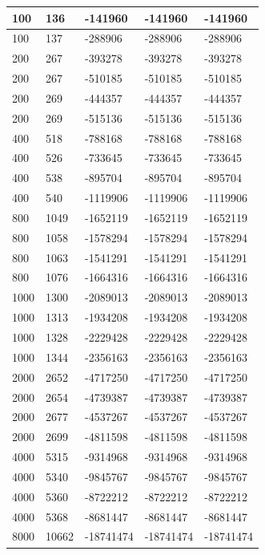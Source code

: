 \begin{longtable}[H]{|p{1.5cm}|p{1.5cm}|p{2cm}|p{3cm}|p{4cm}|}
    100 & 136 & -141960 & -141960 & -141960 \\ \hline
    100 & 137 & -288906 & -288906 & -288906 \\ \hline
    200 & 267 & -393278 & -393278 & -393278 \\ \hline
    200 & 267 & -510185 & -510185 & -510185 \\ \hline
    200 & 269 & -444357 & -444357 & -444357 \\ \hline
    200 & 269 & -515136 & -515136 & -515136 \\ \hline
    400 & 518 & -788168 & -788168 & -788168 \\ \hline
    400 & 526 & -733645 & -733645 & -733645 \\ \hline
    400 & 538 & -895704 & -895704 & -895704 \\ \hline
    400 & 540 & -1119906 & -1119906 & -1119906 \\ \hline
    800 & 1049 & -1652119 & -1652119 & -1652119 \\ \hline 
    800 & 1058 & -1578294 & -1578294 & -1578294 \\ \hline 
    800 & 1063 & -1541291 & -1541291 & -1541291 \\ \hline
    800 & 1076 & -1664316 & -1664316 & -1664316 \\ \hline
    1000 & 1300 & -2089013 & -2089013 & -2089013 \\ \hline
    1000 & 1313 & -1934208 & -1934208 & -1934208 \\ \hline
    1000 & 1328 & -2229428 & -2229428 & -2229428 \\ \hline
    1000 & 1344 & -2356163 & -2356163 & -2356163 \\ \hline
    2000 & 2652 & -4717250 & -4717250 & -4717250 \\ \hline
    2000 & 2654 & -4739387 & -4739387 & -4739387 \\ \hline 
    2000 & 2677 & -4537267 & -4537267 & -4537267 \\ \hline 
    2000 & 2699 & -4811598 & -4811598 & -4811598 \\ \hline 
    4000 & 5315 & -9314968 & -9314968 & -9314968 \\ \hline
    4000 & 5340 & -9845767 & -9845767 & -9845767 \\ \hline
    4000 & 5360 & -8722212 & -8722212 & -8722212 \\ \hline
    4000 & 5368 & -8681447 & -8681447 & -8681447 \\ \hline 
    8000 & 10662 & -18741474 & -18741474 & -18741474 \\ \hline  

\end{longtable}
